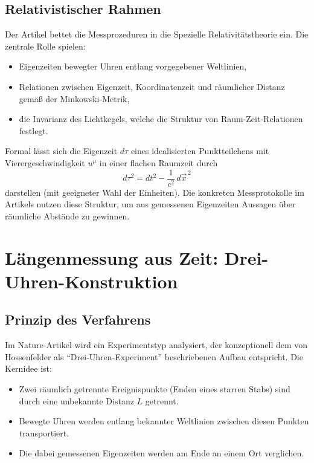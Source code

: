 \subsection{Relativistischer Rahmen}

Der Artikel bettet die Messprozeduren in die Spezielle Relativitätstheorie ein.
Die zentrale Rolle spielen:
\begin{itemize}
  \item Eigenzeiten bewegter Uhren entlang vorgegebener Weltlinien,
  \item Relationen zwischen Eigenzeit, Koordinatenzeit und räumlicher Distanz
        gemäß der Minkowski-Metrik,
  \item die Invarianz des Lichtkegels, welche die Struktur von
        Raum-Zeit-Relationen festlegt.
\end{itemize}

Formal lässt sich die Eigenzeit $d\tau$ eines idealisierten Punktteilchens mit
Vierergeschwindigkeit $u^\mu$ in einer flachen Raumzeit durch
\begin{equation}
  d\tau^2 = dt^2 - \frac{1}{c^2} \, d\vec{x}^{\,2}
\end{equation}
darstellen (mit geeigneter Wahl der Einheiten). Die konkreten Messprotokolle im
Artikels nutzen diese Struktur, um aus gemessenen Eigenzeiten Aussagen über
räumliche Abstände zu gewinnen.

\section{Längenmessung aus Zeit: Drei-Uhren-Konstruktion}

\subsection{Prinzip des Verfahrens}

Im Nature-Artikel wird ein Experimentstyp analysiert, der konzeptionell dem von
Hossenfelder als ``Drei‑Uhren‑Experiment'' beschriebenen Aufbau entspricht. Die
Kernidee ist:
\begin{itemize}
  \item Zwei räumlich getrennte Ereignispunkte (Enden eines starren Stabs) sind
        durch eine unbekannte Distanz $L$ getrennt.
  \item Bewegte Uhren werden entlang bekannter Weltlinien zwischen diesen
        Punkten transportiert.
  \item Die dabei gemessenen Eigenzeiten werden am Ende an einem Ort
        verglichen.
\end{itemize}

